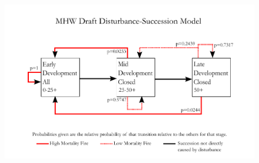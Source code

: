 \documentclass{article}
\begin{document}
\begin{figure}[h]
\includegraphics[width=\textwidth]{MHW_Draft_1.pdf}
\end{figure}
\end{document}
